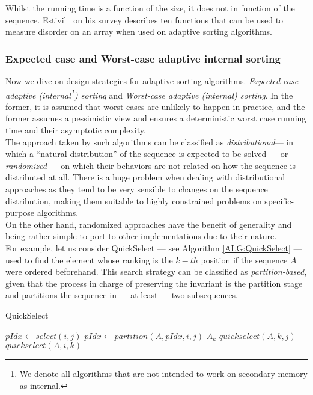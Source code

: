 Whilst the running time is a function of the size, it does not in function of the sequence. Estivil~\cite{estivil92} on his survey describes ten functions that can be used to measure disorder on an array when used on adaptive sorting algorithms.\\

\subsubsection{Expected case and Worst-case adaptive internal sorting}

Now we dive on design strategies for adaptive sorting algorithms. \textit{Expected-case adaptive (internal\footnote{We denote all algorithms that are not intended to work on secondary memory as internal.}) sorting} and \textit{Worst-case adaptive (internal) sorting}. In the former, it is assumed that worst cases are unlikely to happen in practice, and the former assumes a pessimistic view and ensures a deterministic worst case running time and their asymptotic complexity.\\

The approach taken by such algorithms can be classified as \textit{distributional}--- in which a ``natural distribution'' of the sequence is expected to be solved --- or \textit{randomized} --- on which their behaviors are not related on how the sequence is distributed at all. There is a huge problem when dealing with distributional approaches as they tend to be very sensible to changes on the sequence distribution, making them suitable to highly constrained problems on specific-purpose algorithms.\\

On the other hand, randomized approaches have the benefit of generality and being rather simple to port to other implementations due to their nature.\\

For example, let us consider QuickSelect --- see Algorithm \ref{ALG:QuickSelect} --- used to find the element whose ranking is the $k-th$ position if the sequence $A$ were ordered beforehand. This search strategy can be classified as \textit{partition-based}, given that the process in charge of preserving the invariant is the partition stage and partitions the sequence in --- at least --- two subsequences.\\


\begin{algorithm}
  \caption{QuickSelect}\label{ALG:QuickSelect}
  \begin{algorithmic}[1]
    \State $pIdx \gets select(i,j)$
    \State $pIdx \gets partition(A,pIdx,i,j)$
     \Return $A_k$
    \EndIf
     \Return $quickselect(A, k, j)$
    \EndIf
     \Return $quickselect(A, i, k)$
    \EndIf
    \EndProcedure
  \end{algorithmic}
\end{algorithm}

